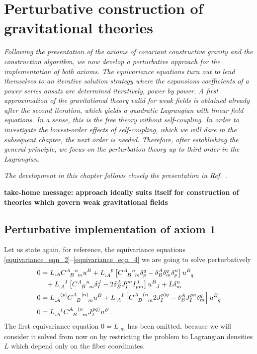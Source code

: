 \chapter{Perturbative construction of gravitational theories}
\label{chapter_perturbation}

\textit{Following the presentation of the axioms of covariant constructive gravity and the construction algorithm, we now develop a perturbative approach for the implementation of both axioms. The equivariance equations turn out to lend themselves to an iterative solution strategy where the expansions coefficients of a power series ansatz are determined iteratively, power by power. A first approximation of the gravitational theory valid for weak fields is obtained already after the second iteration, which yields a quadratic Lagrangian with linear field equations. In a sense, this is the free theory without self-coupling. In order to investigate the lowest-order effects of self-coupling, which we will dare in the subsequent chapter, the next order is needed. Therefore, after establishing the general principle, we focus on the perturbation theory up to third order in the Lagrangian.}

\textit{The development in this chapter follows closely the presentation in Ref.~\cite{ccg_paper}.}

\textbf{take-home message: approach ideally suits itself for construction of theories which govern weak gravitational fields}

\section{Perturbative implementation of axiom 1}

Let us state again, for reference, the equivariance equations \eqref{equivariance_eqn_2}--\eqref{equivariance_eqn_4} we are going to solve perturbatively
\begin{equation*}
    \begin{aligned}
      0 &{} = L_{:A} \gmc{A}{B}{n}{m}u^B + L_{:A}^{\hphantom{:A}p}\left\lbrack\gmc{A}{B}{n}{m} \delta^q_p - \delta^A_B\delta^q_m\delta^n_p\right\rbrack u^{B}_{\hphantom Bq} \nonumber \\
        &{} \hphantom{=} + L_{:A}^{\hphantom{:A}I} \left\lbrack\gmc{A}{B}{n}{m} \delta^J_I - 2 \delta^A_B J^{pn}_{I} I^J_{pm}\right\rbrack u^B_{\hphantom BJ} + L\delta^n_m \\
      0 &{} = L_{:A}^{\hphantom{:A}(p\mid} \gmc{A}{B}{\mid n)}{m} u^B + L_{:A}^{\hphantom{:A}I}\left\lbrack\gmc{A}{B}{(n}{m} 2J^{p)q}_I - \delta^A_B J^{pn}_I \delta^q_m\right\rbrack u^B_{\hphantom Bq} \\
      0 &{} = L_{:A}^{\hphantom{:A}I} \gmc{A}{B}{(n}{m} J^{pq)}_I u^B.
    \end{aligned}
\end{equation*}
The first equivariance equation $0 = L_{,m}$ has been omitted, because we will consider it solved from now on by restricting the problem to Lagrangian densities $L$ which depend only on the fiber coordinates.

